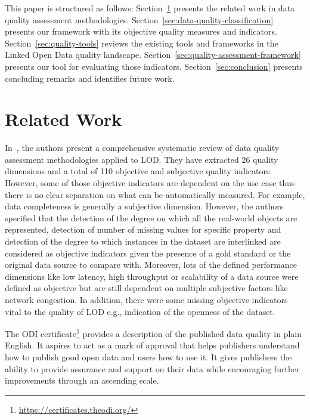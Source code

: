 \documentclass[onecolumn, crcready]{../../Tools/LaTEX/iosart2c}
\begin{document}
This paper is structured as follows: Section~\ref{sec:related-work} presents the related work in data quality assessment methodologies. Section~\ref{sec:data-quality-classification} presents our framework with its objective quality measures and indicators. Section~\ref{sec:quality-tools} reviews the existing tools and frameworks in the Linked Open Data quality landscape. Section~\ref{sec:quality-assessment-framework} presents our tool for evaluating those indicators. Section~\ref{sec:conclusion} presents concluding remarks and identifies future work.


\section{Related Work}
\label{sec:related-work}
In~\cite{Zaveri:SemWebJorunal:12}, the authors present a comprehensive systematic review of data quality assessment methodologies applied to LOD. They have extracted 26 quality dimensions and a total of 110 objective and subjective quality indicators. However, some of those objective indicators are dependent on the use case thus there is no clear separation on what can be automatically measured. For example, data completeness is generally a subjective dimension. However, the authors specified that the detection of the degree on which all the real-world objects are represented, detection of number of missing values for specific property and detection of the degree to which instances in the dataset are interlinked are considered as objective indicators given the presence of a gold standard or the original data source to compare with. Moreover, lots of the defined performance dimensions like low latency, high throughput or scalability of a data source were defined as objective but are still dependent on multiple subjective factors like network congestion. In addition, there were some missing objective indicators vital to the quality of LOD e.g., indication of the openness of the dataset.

The ODI certificate\footnote{\url{https://certificates.theodi.org/}} provides a description of the published data quality in plain English. It aspires to act as a mark of approval that helps publishers understand how to publish good open data and users how to use it. It gives publishers the ability to provide assurance and support on their data while encouraging further improvements through an ascending scale.
\end{document}
